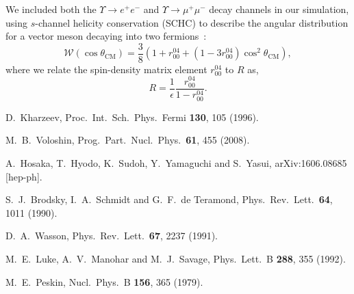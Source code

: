 \documentclass[prd,amsmath,%
twocolumn,floatfix,amssymb, preprintnumbers, nofootinbib, superscriptaddress]{revtex4}
\newcommand{\beq}{\begin{equation}}
\newcommand{\eeq}{\end{equation}}
\begin{document}
We included both the $\Upsilon \to e^+e^-$ and $\Upsilon \to \mu^+\mu^-$ decay channels
in our simulation, using $s$-channel helicity conservation (SCHC) to describe the
angular distribution for a vector meson decaying into two fermions~\cite{Breitweg:1998nh,Chekanov:2002xi,Schilling:1973ag}:
\beq
\mathcal{W}(\cos\theta_\text{CM}) = 
\frac{3}{8}(1+r^{04}_{00}+(1-3r_{00}^{04})\cos^2\theta_\text{CM}),
\eeq
where we relate the spin-density matrix element $r^{04}_{00}$ to $R$ as,
\beq
R = \frac{1}{\epsilon}\frac{r^{04}_{00}}{1-r^{04}_{00}}.
\eeq


\begin{thebibliography}{99}

  D.~Kharzeev,
  Proc.\ Int.\ Sch.\ Phys.\ Fermi {\bf 130}, 105 (1996).

  M.~B.~Voloshin,
  Prog.\ Part.\ Nucl.\ Phys.\  {\bf 61}, 455 (2008).
  
  A.~Hosaka, T.~Hyodo, K.~Sudoh, Y.~Yamaguchi and S.~Yasui,
  arXiv:1606.08685 [hep-ph].

  S.~J.~Brodsky, I.~A.~Schmidt and G.~F.~de Teramond,
  Phys.\ Rev.\ Lett.\  {\bf 64}, 1011 (1990).
  
  D.~A.~Wasson,
  Phys.\ Rev.\ Lett.\  {\bf 67}, 2237 (1991).
  
  M.~E.~Luke, A.~V.~Manohar and M.~J.~Savage,
  Phys.\ Lett.\ B {\bf 288}, 355 (1992). 

  M.~E.~Peskin,
  Nucl.\ Phys.\ B {\bf 156}, 365 (1979).


\end{thebibliography}
\end{document}
